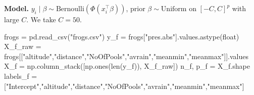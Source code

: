\documentclass[
  letterpaper,
  DIV=11,
  numbers=noendperiod]{scrartcl}
\newenvironment{Shaded}{\begin{snugshade}}{\end{snugshade}}
\newcommand{\BuiltInTok}[1]{\textcolor[rgb]{0.00,0.23,0.31}{#1}}
\newcommand{\NormalTok}[1]{\textcolor[rgb]{0.00,0.23,0.31}{#1}}
\newcommand{\OperatorTok}[1]{\textcolor[rgb]{0.37,0.37,0.37}{#1}}
\newcommand{\StringTok}[1]{\textcolor[rgb]{0.13,0.47,0.30}{#1}}
\begin{document}
\textbf{Model.}
\(y_i \mid \beta \sim \text{Bernoulli}(\Phi(x_i^\top\beta))\), prior
\(\beta \sim \text{Uniform}\) on \([-C, C]^p\) with large \(C\). We take
\(C = 50\).

\begin{Shaded}
\begin{Highlighting}[]
\NormalTok{frogs }\OperatorTok{=}\NormalTok{ pd.read\_csv(}\StringTok{"frogs.csv"}\NormalTok{)}
\NormalTok{y\_f }\OperatorTok{=}\NormalTok{ frogs[}\StringTok{"pres.abs"}\NormalTok{].values.astype(}\BuiltInTok{float}\NormalTok{)}
\NormalTok{X\_f\_raw }\OperatorTok{=}\NormalTok{ frogs[[}\StringTok{"altitude"}\NormalTok{,}\StringTok{"distance"}\NormalTok{,}\StringTok{"NoOfPools"}\NormalTok{,}\StringTok{"avrain"}\NormalTok{,}\StringTok{"meanmin"}\NormalTok{,}\StringTok{"meanmax"}\NormalTok{]].values}
\NormalTok{X\_f }\OperatorTok{=}\NormalTok{ np.column\_stack([np.ones(}\BuiltInTok{len}\NormalTok{(y\_f)), X\_f\_raw])}
\NormalTok{n\_f, p\_f }\OperatorTok{=}\NormalTok{ X\_f.shape}
\NormalTok{labels\_f }\OperatorTok{=}\NormalTok{ [}\StringTok{"Intercept"}\NormalTok{,}\StringTok{"altitude"}\NormalTok{,}\StringTok{"distance"}\NormalTok{,}\StringTok{"NoOfPools"}\NormalTok{,}\StringTok{"avrain"}\NormalTok{,}\StringTok{"meanmin"}\NormalTok{,}\StringTok{"meanmax"}\NormalTok{]}


\end{Highlighting}
\end{Shaded}
\end{document}
